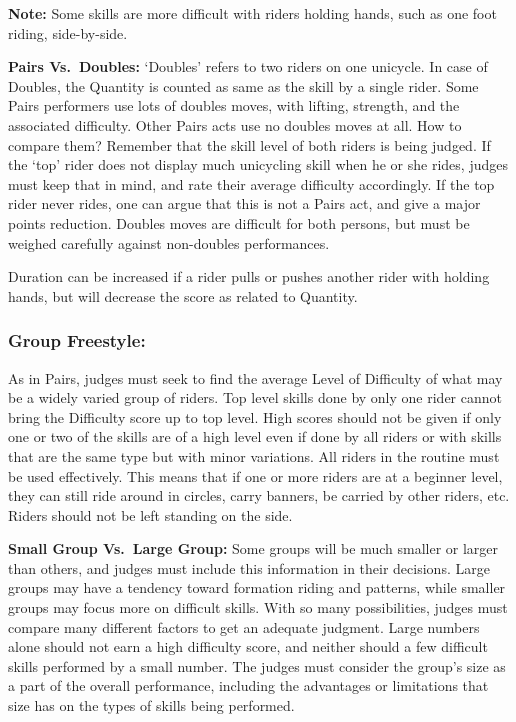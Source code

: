 \textbf{Note:} Some skills are more difficult with riders holding hands, such as one foot riding, side-by-side.

\textbf{Pairs Vs.\ Doubles:} `Doubles' refers to two riders on one unicycle.
In case of Doubles, the Quantity is counted as same as the skill by a single rider.
Some Pairs performers use lots of doubles moves, with lifting, strength, and the associated difficulty.
Other Pairs acts use no doubles moves at all.
How to compare them?
Remember that the skill level of both riders is being judged.
If the `top' rider does not display much unicycling skill when he or she rides, judges must keep that in mind, and rate their average difficulty accordingly.
If the top rider never rides, one can argue that this is not a Pairs act, and give a major points reduction.
Doubles moves are difficult for both persons, but must be weighed carefully against non-doubles performances.

Duration can be increased if a rider pulls or pushes another rider with holding hands, but will decrease the score as related to Quantity.

\subsubsection{Group Freestyle:}
As in Pairs, judges must seek to find the average Level of Difficulty of what may be a widely varied group of riders.
Top level skills done by only one rider cannot bring the Difficulty score up to top level.
High scores should not be given if only one or two of the skills are of a high level even if done by all riders or with skills that are the same type but with minor variations.
All riders in the routine must be used effectively.
This means that if one or more riders are at a beginner level, they can still ride around in circles, carry banners, be carried by other riders, etc.
Riders should not be left standing on the side.

\textbf{Small Group Vs.\ Large Group:} Some groups will be much smaller or larger than others, and judges must include this information in their decisions.
Large groups may have a tendency toward formation riding and patterns, while smaller groups may focus more on difficult skills.
With so many possibilities, judges must compare many different factors to get an adequate judgment.
Large numbers alone should not earn a high difficulty score, and neither should a few difficult skills performed by a small number.
The judges must consider the group's size as a part of the overall performance, including the advantages or limitations that size has on the types of skills being performed.

